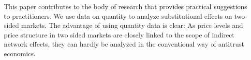 \documentclass[12pt,a4paper,notitlepage]{article}
\begin{document}
%
%

This paper contributes to the body of research that provides practical suggestions to practitioners. We use data on quantity to analyze substitutional effects on two-sided markets. The advantage of using quantity data is clear: As price levels and price structure in two sided markets are closely linked to the scope of indirect network effects, they can hardly be analyzed in the conventional way of antitrust economics. 


\end{document}
